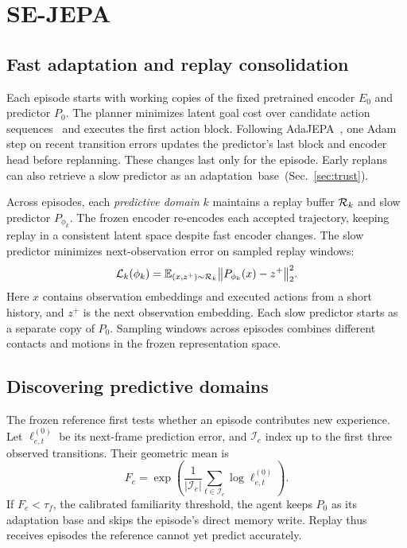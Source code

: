 \section{SE-JEPA}
\label{sec:method}



\subsection{Fast adaptation and replay consolidation}
\label{sec:fast}
\label{sec:slow}

Each episode starts with working copies of the fixed pretrained encoder $E_0$ and predictor $P_0$. The planner minimizes latent goal cost over candidate action sequences~\cite{zhou2024dinowm,maes2026lewm} and executes the first action block. Following AdaJEPA~\cite{wang2026adajepa}, one Adam step on recent transition errors updates the predictor's last block and encoder head before replanning. These changes last only for the episode. Early replans can also retrieve a slow predictor as an \mbox{adaptation base (Sec.~\ref{sec:trust})}.

Across episodes, each \emph{predictive domain} $k$ maintains a replay buffer $\mathcal{R}_k$ and slow predictor $P_{\phi_k}$. The frozen encoder re-encodes each accepted trajectory, keeping replay in a consistent latent space despite fast encoder changes. The slow predictor minimizes next-observation error on sampled replay windows:
\begin{equation}
  \mathcal{L}_k(\phi_k)=
  \mathbb{E}_{(x,z^+)\sim\mathcal{R}_k}
  \big\|P_{\phi_k}(x)-z^+\big\|_2^2.
  \label{eq:replay}
\end{equation}
Here $x$ contains observation embeddings and executed actions from a short history, and $z^+$ is the next observation embedding. Each slow predictor starts as a separate copy of $P_0$. Sampling windows across episodes combines different contacts and motions in the frozen representation space.

\subsection{Discovering predictive domains}
\label{sec:write}

The frozen reference first tests whether an episode contributes new experience. Let $\ell^{(0)}_{e,t}$ be its next-frame prediction error, and $\mathcal{I}_e$ index up to the first three observed transitions. Their geometric mean is
\begin{equation}
  F_e=\exp\!\left(\frac{1}{|\mathcal{I}_e|}
  \sum_{t\in\mathcal{I}_e}\log\ell^{(0)}_{e,t}\right).
  \label{eq:familiarity}
\end{equation}
If $F_e<\tau_f$, the calibrated familiarity threshold, the agent keeps $P_0$ as its adaptation base and skips the episode's direct memory write. Replay thus receives episodes the reference cannot yet predict accurately.

